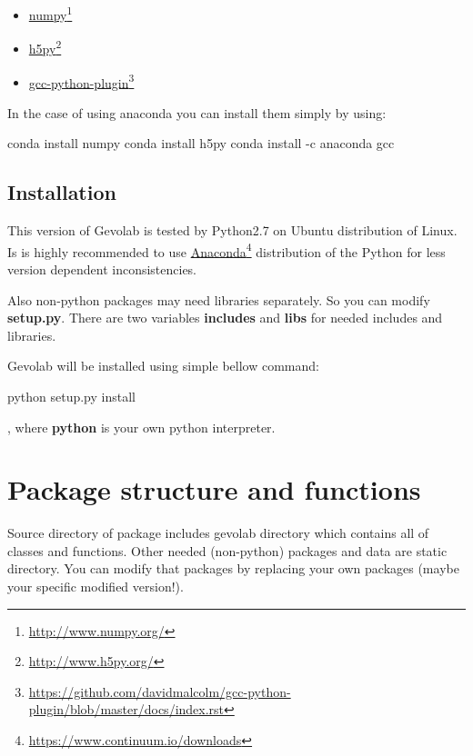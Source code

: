 \documentclass[a4paper, 12 pt]{article}
\newcommand\fnurl[2]{%
  \href{#2}{#1}\footnote{\url{#2}}%
}
\begin{document}
\begin{itemize}
\item \fnurl{numpy}{http://www.numpy.org/}
\item \fnurl{h5py}{http://www.h5py.org/}
\item \fnurl{gcc-python-plugin}{https://github.com/davidmalcolm/gcc-python-plugin/blob/master/docs/index.rst}
\end{itemize}

In the case of using anaconda you can install them simply by using:
\begin{commandshell}
conda install numpy
conda install h5py
conda install -c anaconda gcc
\end{commandshell}


\subsection{Installation}
This version of Gevolab is tested by Python2.7 on Ubuntu distribution of Linux. Is is highly recommended to use \fnurl{Anaconda}{https://www.continuum.io/downloads} distribution of the Python for less version dependent inconsistencies.

Also non-python packages may need libraries separately. So you can modify \textbf{setup.py}. There are two variables \textbf{includes} and \textbf{libs} for needed includes and libraries.

Gevolab will be installed using simple bellow command:

\begin{commandshell}
python setup.py install
\end{commandshell}, 
where \textbf{python} is your own python interpreter. 


\section{Package structure and functions}
Source directory of package includes gevolab directory which contains all of classes and functions. Other needed (non-python) packages and data are static directory. You can modify that packages by replacing your own packages (maybe your specific modified version!). 
\end{document}
